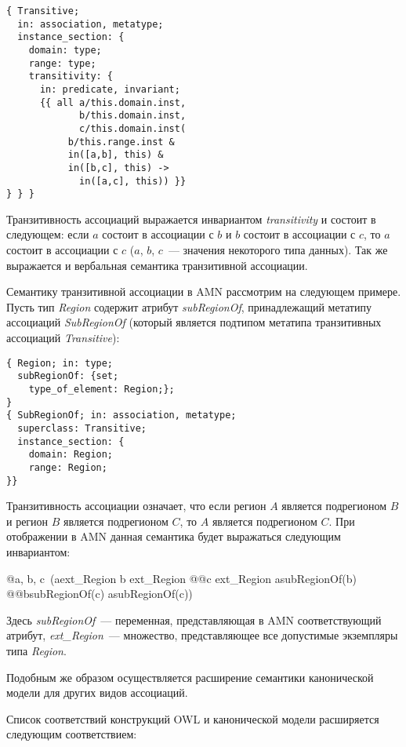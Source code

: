 \begin{multicols}{2}
{\small
\begin{verbatim}
{ Transitive; 
  in: association, metatype;
  instance_section: {
    domain: type;
    range: type;
    transitivity: { 
      in: predicate, invariant;
      {{ all a/this.domain.inst, 
             b/this.domain.inst, 
             c/this.domain.inst(
           b/this.range.inst & 
           in([a,b], this) & 
           in([b,c], this) ->
             in([a,c], this)) }}
} } }
\end{verbatim}
}


Транзитивность ассоциаций выражается инвариантом {\it transitivity}
и состоит в следующем: если $a$ состоит в ассоциации с $b$ и
$b$ состоит в ассоциации с $c$, то $a$ состоит в ассоциации с $c$
($a$, $b$, $c$~--- значения некоторого типа данных).
Так же выражается и вербальная семантика транзитивной ас\-со\-ци\-ации.
{

}

Семантику транзитивной ассоциации в AMN рассмотрим на следующем примере.
Пусть тип {\it Region} содержит атрибут {\it subRegionOf},
принадлежащий метатипу ассоциаций {\it SubRegionOf}
(который является подтипом метатипа транзитивных ассоциаций {\it Transitive}):
{\small
\begin{verbatim}
{ Region; in: type;
  subRegionOf: {set;
    type_of_element: Region;};
}
{ SubRegionOf; in: association, metatype;
  superclass: Transitive;
  instance_section: { 
    domain: Region;
    range: Region; 
}}
\end{verbatim}
}

Транзитивность ассоциации означает, что если регион $A$ является
подрегионом $B$ и регион $B$ является подрегионом $C$,
то $A$ является подрегионом $C$. При отображении в AMN
данная семантика будет выражаться следующим инвариантом:

\begin{prog}
@\forall a, b, c~(a\in ext\_Region \land b \in ext\_Region \land
@@c \in ext\_Region \land a\in subRegionOf(b) \land
@@b\in subRegionOf(c) \Rightarrow a\in subRegionOf(c))
\end{prog}

\noindent
Здесь {\it subRegionOf}~--- переменная, представ\-ля\-ющая в AMN
соответствующий атрибут, {\it ext\_Region}~--- множество,
представляющее все допустимые экземпляры типа {\it Region}.

Подобным же образом осуществляется расширение семантики канонической модели
для других видов ассоциаций.

Список соответствий конструкций OWL и канонической модели
расширяется следующим соответствием:


\end{multicols}

